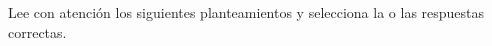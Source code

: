 Lee con atención los siguientes planteamientos y selecciona la o las respuestas correctas.

\begin{parts}
    
    
    
    
    
    
    
\end{parts}